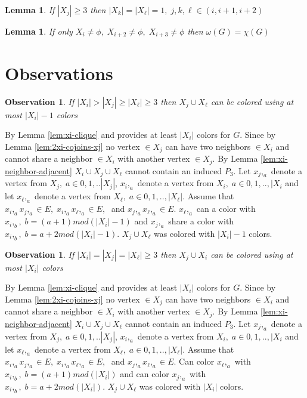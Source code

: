 \documentclass[12pt]{article}
\newtheorem{Lemma}[Theorem]{Lemma}
\newtheorem{Observation}[Theorem]{Observation}
\begin{document}
\begin{Lemma}\label{lem:three-consecutive-xi}
If $|X_j| \geq 3$ then $|X_k| = |X_\ell| = 1,\; j,k,\ell \in ({i,i+1,i+2})$
\end{Lemma}

\begin{Lemma}\label{lem:coloring-xi-xi2-xi3}
If only $X_i \neq \phi,\; X_{i+2} \neq \phi,\; X_{i+3} \neq \phi$ then $ \omega(G) = \chi(G)$
\end{Lemma}

\section{Observations}\label{sec:obs}
\begin{Observation}\label{obs:xi-g}
If $|X_i| > |X_j| \geq |X_\ell| \geq 3$ then $X_j \cup X_\ell$ can be colored using at most $|X_i| - 1$ colors
\end{Observation} 
 By Lemma \ref{lem:xi-clique} and provides at least $|X_i|$ colors for $G$. Since by Lemma \ref{lem:2xi-cojoins-xj} no vertex $\in X_j$ can have two neighbors $\in X_i$ and cannot share a neighbor $\in X_i$ with another vertex $\in X_j$. By Lemma \ref{lem:xi-neighbor-adjacent} $X_i \cup X_j \cup X_\ell$ cannot contain an induced $P_3$. Let $x_j,_a$ denote a vertex from $X_j,\; a \in {0, 1,..|X_j|}$, $x_i,_a$ denote a vertex from $X_i,\; a \in {0, 1,.., |X_i}$ and let $x_\ell,_a$ denote a vertex from $X_\ell, \; a \in {0, 1,.., |X_\ell|}$. Assume that $x_i,_ax_j,_a \in E,\; x_i,_ax_\ell,_a \in E,\;$ and $ x_j,_ax_\ell,_a \in E$. $x_\ell,_a$ can a color with $x_i,_{b},\; b = (a +1) mod (|X_i| - 1)$ and $x_j,_a$ share a color with $x_i,_{b},\; b = a+2 mod(|X_i| - 1)$.  $X_j \cup X_\ell$ was colored with $|X_i| - 1$ colors.

\begin{Observation}\label{obs:all-equal}
If $|X_i| = |X_j| = |X_\ell| \geq 3$ then $X_j \cup X_i$ can be colored using at most $|X_i|$ colors
\end{Observation}
 By Lemma \ref{lem:xi-clique} and provides at least $|X_i|$ colors for $G$. Since by Lemma \ref{lem:2xi-cojoins-xj} no vertex $\in X_j$ can have two neighbors $\in X_i$ and cannot share a neighbor $\in X_i$ with another vertex $\in X_j$. By Lemma \ref{lem:xi-neighbor-adjacent} $X_i \cup X_j \cup X_\ell$ cannot contain an induced $P_3$. Let $x_j,_a$ denote a vertex from $X_j,\; a \in {0, 1,..|X_j|}$, $x_i,_a$ denote a vertex from $X_i,\; a \in {0, 1,.., |X_i}$ and let $x_\ell,_a$ denote a vertex from $X_\ell, \; a \in {0, 1,.., |X_\ell|}$. Assume that $x_i,_ax_j,_a \in E,\; x_i,_ax_\ell,_a \in E,\;$ and $ x_j,_ax_\ell,_a \in E$. Can color $x_\ell,_a$ with $x_i,_{b},\; b = (a +1) mod (|X_i|)$ and can color $x_j,_a$ with $x_i,_{b},\; b = a+2 mod(|X_i|)$.  $X_j \cup X_\ell$ was colored with $|X_i|$ colors.
\end{document}
